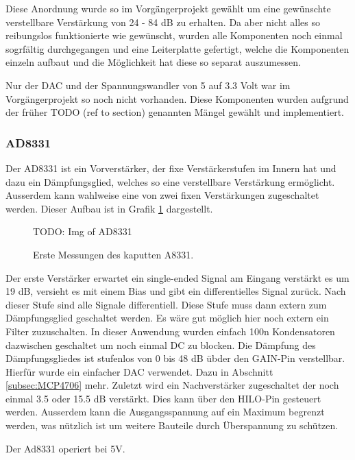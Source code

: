 Diese Anordnung wurde so im Vorgängerprojekt gewählt um eine gewünschte verstellbare Verstärkung von 24 - 84 dB zu erhalten.
Da aber nicht alles so reibungslos funktionierte wie gewünscht, wurden alle Komponenten noch einmal sogrfältig durchgegangen und eine Leiterplatte gefertigt, welche die Komponenten einzeln aufbaut und die Möglichkeit hat diese so separat auszumessen.

Nur der DAC und der Spannungswandler von 5 auf 3.3 Volt war im Vorgängerprojekt so noch nicht vorhanden. Diese Komponenten wurden aufgrund der früher TODO (ref to section) genannten Mängel gewählt und implementiert.

\subsubsection{AD8331}

Der AD8331 ist ein Vorverstärker, der fixe Verstärkerstufen im Innern hat und dazu ein Dämpfungsglied, welches so eine verstellbare Verstärkung ermöglicht. Ausserdem kann wahlweise eine von zwei fixen Verstärkungen zugeschaltet werden. Dieser Aufbau ist in Grafik \ref{fig:AD8331} dargestellt.

\begin{figure}[H]
\begin{center}
    TODO: Img of AD8331
    \caption{Erste Messungen des kaputten A8331.}
    \label{fig:AD8331}
\end{center}
\end{figure}

Der erste Verstärker erwartet ein single-ended Signal am Eingang verstärkt es um 19 dB, versieht es mit einem Bias und gibt ein differentielles Signal zurück. Nach dieser Stufe sind alle Signale differentiell.
Diese Stufe muss dann extern zum Dämpfungsglied geschaltet werden. Es wäre gut möglich hier noch extern ein Filter zuzuschalten. In dieser Anwendung wurden einfach 100n Kondensatoren dazwischen geschaltet um noch einmal DC zu blocken.
Die Dämpfung des Dämpfungsgliedes ist stufenlos von 0 bis 48 dB übder den GAIN-Pin verstellbar. Hierfür wurde ein einfacher DAC verwendet. Dazu in Abschnitt \ref{subsec:MCP4706} mehr.
Zuletzt wird ein Nachverstärker zugeschaltet der noch einmal 3.5 oder 15.5 dB verstärkt. Dies kann über den HILO-Pin gesteuert werden.
Ausserdem kann die Ausgangsspannung auf ein Maximum begrenzt werden, was nützlich ist um weitere Bauteile durch Überspannung zu schützen.

Der Ad8331 operiert bei 5V.

